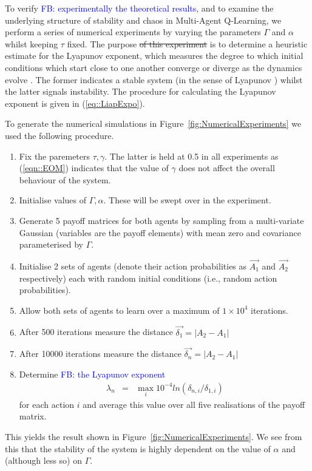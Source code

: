 \documentclass[sigconf,anonymous]{aamas}
\newcommand\fb[1]{\textcolor{blue}{FB: #1}}
\begin{document}
To verify \fb{experimentally the theoretical results}, and to examine the underlying structure of stability and chaos in
Multi-Agent Q-Learning, we perform a series of numerical experiments by varying the parameters $\Gamma$ and
$\alpha$ whilst keeping $\tau$ fixed. The purpose 
\st{of this experiment} is to determine a heuristic estimate for the Lyapunov exponent, which measures the degree to which initial conditions which start close to one another converge or diverge as the dynamics evolve \cite{Strogatz2000}. The former indicates a stable system (in the sense of Lyapunov \cite{}) whilst the latter signals instability. The procedure for calculating the Lyapunov exponent is given in (\ref{eq::LiapExpo}).


To generate the numerical simulations in Figure~\ref{fig:NumericalExperiments} we used the
following procedure.
\begin{enumerate}
   \item Fix the paremeters $\tau, \gamma$. The latter is held at 0.5 in all experiments as (\ref{eqn::EOM}) indicates that the value of $\gamma$ does not affect the overall behaviour of the system.
   \item Initialise values of $\Gamma, \alpha$. These will be swept over in the experiment.
\item Generate 5 payoff matrices for both agents by sampling from a multi-variate Gaussian 
(variables are the payoff elements) with mean zero and covariance parameterised by $\Gamma$.
\item Initialise 2 sets of agents (denote their action probabilities as $\Vec{A_1}$ and $\Vec{A_2}$ respectively) each with random initial conditions (i.e., random action probabilities).
\item Allow both sets of agents to learn over a maximum of $1 \times 10^4$ iterations.
\item After 500 iterations measure the distance $\Vec{\delta_1} = |A_2 - A_1|$
\item After 10000 iterations measure the distance $\Vec{\delta_n} = |A_2 - A_1|$
\item Determine \fb{the Lyapunov exponent} 
\begin{eqnarray*}
\label{eq::LiapExpo}
    \lambda_n & = & \max_{i} 10^{-4} ln(\delta_{n, i}/\delta_{1, i})
\end{eqnarray*}
for each action $i$ and average this value over all five realisations of the payoff matrix. 
\end{enumerate}
   
This yields the result shown in Figure~\ref{fig:NumericalExperiments}. We see from this that the stability of the system is highly dependent on
the value of $\alpha$ and (although less so) on $\Gamma$.
   
\end{document}
